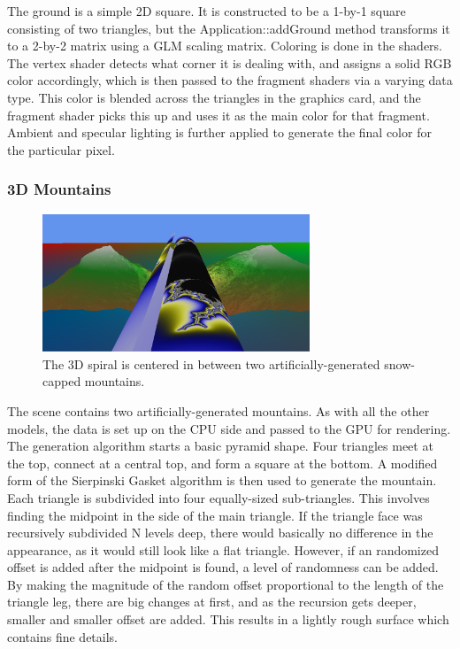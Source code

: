 \documentclass[journal]{IEEEtran}
\begin{document}
The ground is a simple 2D square. It is constructed to be a 1-by-1 square consisting of two triangles, but the Application::addGround method transforms it to a 2-by-2 matrix using a GLM scaling matrix. Coloring is done in the shaders. The vertex shader detects what corner it is dealing with, and assigns a solid RGB color accordingly, which is then passed to the fragment shaders via a varying data type. This color is blended across the triangles in the graphics card, and the fragment shader picks this up and uses it as the main color for that fragment. Ambient and specular lighting is further applied to generate the final color for the particular pixel.

\subsubsection{3D Mountains}

\begin{figure}[htbp]
\centering
\fbox
{
	\begin{minipage}{8 cm}
		\includegraphics[width=80mm]{resources/screenshot2.png}
		\caption{The 3D spiral is centered in between two artificially-generated snow-capped mountains.}
	\end{minipage}
}
\end{figure}

The scene contains two artificially-generated mountains. As with all the other models, the data is set up on the CPU side and passed to the GPU for rendering. The generation algorithm starts a basic pyramid shape. Four triangles meet at the top, connect at a central top, and form a square at the bottom. A modified form of the Sierpinski Gasket algorithm is then used to generate the mountain. Each triangle is subdivided into four equally-sized sub-triangles. This involves finding the midpoint in the side of the main triangle. If the triangle face was recursively subdivided N levels deep, there would basically no difference in the appearance, as it would still look like a flat triangle. However, if an randomized offset is added after the midpoint is found, a level of randomness can be added. By making the magnitude of the random offset proportional to the length of the triangle leg, there are big changes at first, and as the recursion gets deeper, smaller and smaller offset are added. This results in a lightly rough surface which contains fine details.
\end{document}
